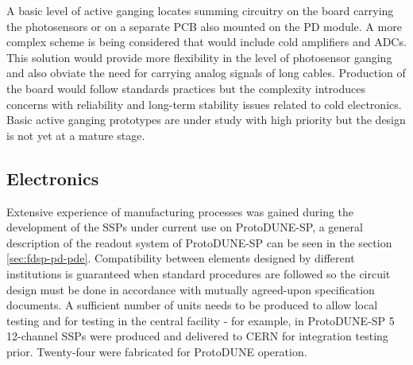 A basic level of active ganging locates summing circuitry on the board carrying the photosensors or on a separate PCB also mounted on the PD module.
A more complex scheme is being considered that would include cold amplifiers and ADCs. This solution would provide more flexibility in the level of photosensor ganging and also obviate the need for carrying analog signals of long cables. Production of the board would follow standards practices but the complexity introduces concerns with reliability and long-term stability issues related to cold electronics.  Basic active ganging prototypes are under study with high priority but the design is not yet at a mature stage. 




\subsection{Electronics}
\label{sec:fdsp-pd-assy-pde}

Extensive experience of manufacturing processes was gained during the development of the SSPs under current use on ProtoDUNE-SP, a general description of the readout system of ProtoDUNE-SP can be seen in the section \ref{sec:fdsp-pd-pde}. Compatibility between elements designed by different institutions is guaranteed when standard procedures are followed so the circuit design must be done in accordance with mutually agreed-upon specification documents.  A sufficient  number of units needs to be produced to allow local testing and for testing in the central facility - for example, in ProtoDUNE-SP \num{5} 12-channel  SSPs were produced and delivered to CERN for integration testing prior. Twenty-four were fabricated for ProtoDUNE operation. 

